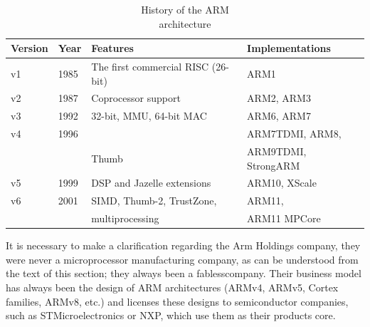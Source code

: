 \begin{table}[htbp]
    \centering
    \begin{tabular}{|l|l|l|l|}
        \toprule
        Version & Year  & Features  &   Implementations \\
        \midrule
        v1      & 1985  & The first commercial RISC (26-bit) & ARM1 \\
        \hline
        v2      & 1987  & Coprocessor support           & ARM2, ARM3 \\
        \hline
        v3      & 1992  & 32-bit, MMU, 64-bit MAC       & ARM6, ARM7 \\
        \hline
        v4      & 1996  &                               & ARM7TDMI, ARM8, \\
                &       & Thumb                         & ARM9TDMI, StrongARM \\
        \hline
        v5      & 1999  & DSP and Jazelle extensions    & ARM10, XScale \\
        \hline
        v6      & 2001  & SIMD, Thumb-2, TrustZone,     & ARM11,  \\
                &       & multiprocessing               & ARM11 MPCore\\
        \bottomrule
    \end{tabular}

    \caption
        {
            History of the ARM \\
            architecture
        }

    \cite{Levy2005} \cite{ArmVir2020}
    \label{tab:arm_history}
\end{table}

It is necessary to make a clarification regarding the Arm Holdings company, they 
were never a microprocessor manufacturing company, as can be understood from the 
text of this section; they always been a fabless\footnotemark[1] company. Their business model has 
always been the design of ARM architectures (ARMv4, ARMv5, Cortex 
families, ARMv8, etc.) and licenses these designs to semiconductor companies, such 
as STMicroelectronics or NXP, which use them as their products core.\\












